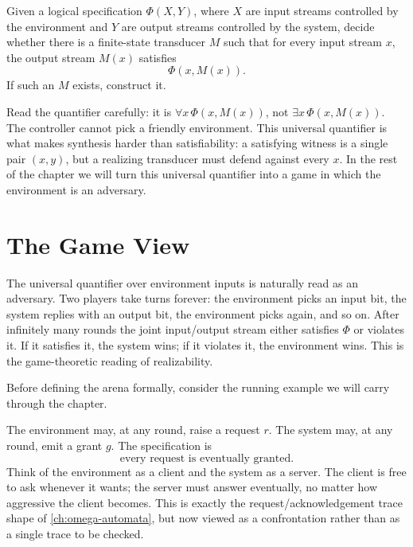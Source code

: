 \begin{definition}
\label{def:church-synthesis}
Given a logical specification $\Phi(X,Y)$, where $X$ are input streams
controlled by the environment and $Y$ are output streams controlled by
the system, decide whether there is a finite-state transducer $M$ such
that for every input stream $x$, the output stream $M(x)$ satisfies
\[
  \Phi(x,M(x)).
\]
If such an $M$ exists, construct it.
\end{definition}

Read the quantifier carefully: it is $\forall x\,\Phi(x,M(x))$, not
$\exists x\,\Phi(x,M(x))$.  The controller cannot pick a friendly
environment.  This universal quantifier is what makes synthesis harder
than satisfiability: a satisfying witness is a single pair $(x,y)$, but
a realizing transducer must defend against every $x$.  In the rest of
the chapter we will turn this universal quantifier into a game in which
the environment is an adversary.


\section{The Game View}
\label{sec:game-view}

The universal quantifier over environment inputs is naturally read as an
adversary.  Two players take turns forever: the environment picks an
input bit, the system replies with an output bit, the environment picks
again, and so on.  After infinitely many rounds the joint input/output
stream either satisfies $\Phi$ or violates it.  If it satisfies it, the
system wins; if it violates it, the environment wins.  This is the
game-theoretic reading of realizability.

Before defining the arena formally, consider the running example we will
carry through the chapter.

\begin{example}
\label{ex:request-grant-informal}
The environment may, at any round, raise a request $r$.  The system may,
at any round, emit a grant $g$.  The specification is
\[
  \text{every request is eventually granted.}
\]
Think of the environment as a client and the system as a server.  The
client is free to ask whenever it wants; the server must answer
eventually, no matter how aggressive the client becomes.  This is
exactly the request/acknowledgement trace shape of
\cref{ch:omega-automata}, but now viewed as a confrontation rather than
as a single trace to be checked.
\end{example}

